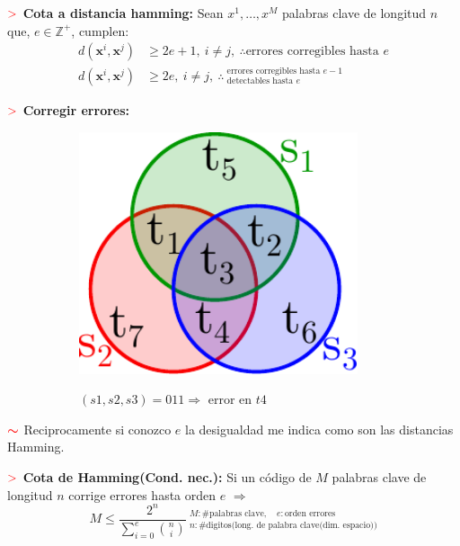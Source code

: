 \documentclass[%
 reprint,
 amsmath,amssymb,
 aps,
]{revtex4-1}
\begin{document}
\textbf{$\textcolor{red}{\mathbf{>}}$ Cota a distancia hamming:} 
Sean $x^{1}, \ldots, x^{M}$ palabras clave de longitud $n$ que, $e \in \mathbb{Z}^+$, cumplen:
$$
\begin{aligned}
  d\left(\boldsymbol{x}^{i}, \boldsymbol{x}^{j}\right) &\geq 2 e+1, \ i \neq j, \ \boldsymbol{\therefore}\text{errores corregibles hasta $e$}\\
  d\left(\boldsymbol{x}^{i}, \boldsymbol{x}^{j}\right) &\geq 2 e, \ i \neq j, \ \boldsymbol{\therefore} \ 
  ^\text{errores corregibles hasta $e-1$}_\text{detectables hasta $e$} 
\end{aligned}
$$

\textbf{$\textcolor{red}{\mathbf{>}}$ Corregir errores:} 
\begin{figure}[!ht]
  \begin{subfigure}{0.1\textwidth}
    \centering
    \includegraphics[width = 0.9\textwidth]{parity.pdf}
  \end{subfigure}\qquad
  \begin{subfigure}{0.2\textwidth}
    $(s1,s2,s3)=011 \Rightarrow$ error en $t4$
  \end{subfigure}
\end{figure}

\textbf{$\textcolor{red}{\color{red}{\boldsymbol{\sim}}}$} Reciprocamente si conozco $e$ la desigualdad me indica como son las distancias Hamming.

\textbf{$\textcolor{red}{\mathbf{>}}$ Cota de Hamming(Cond. nec.):} 
Si un código de $M$ palabras clave de longitud $n$ corrige errores hasta orden $e$ $\Rightarrow$
$$
M \leq \frac{2^{n}}{\sum_{i=0}^{e}{n \choose i}} \ 
^{M: \#\text{palabras clave}, \quad e:\text{orden errores}}_{n: \#\text{digitos(long. de palabra clave(dim. espacio))}}
$$
\end{document}
